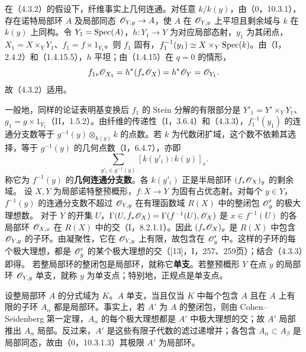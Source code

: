 在（4.3.2）的假设下，纤维事实上几何连通。对任意 $k/k(y)$，由（0，10.3.1），存在诺特局部环 $A$ 及局部同态 $\mathscr O_{Y,y}\to A$，使 $A$ 在 $\mathscr O_{Y,y}$ 上平坦且剩余域与 $k$ 在 $k(y)$ 上同构。令 $Y_1=\operatorname{Spec}(A)$，$h:Y_1\to Y$ 为对应局部态射，$y_1$ 为其闭点，$X_1=X\times_YY_1$、$f_1=f\times1_{Y_1}$。则 $f_1$ 固有，$f_1^{-1}(y_1)\simeq X\times_Y\operatorname{Spec}(k)$。由（I，2.4.2）和（1.4.15.5），$h$ 平坦；由（1.4.15）在 $q=0$ 的情形，
\[
f_{1*}\mathscr O_{X_1}=h^*(f_*\mathscr O_X)=h^*\mathscr O_Y=\mathscr O_{Y_1}.
\]
故（4.3.2）适用。

一般地，同样的论证表明基变换后 $f_1$ 的 Stein 分解的有限部分是 $Y'_1=Y'\times_YY_1$、$g_1=g\times1_{Y_1}$（II，1.5.2）。由纤维的传递性（I，3.6.4）和（4.3.3），$f_1^{-1}(y_1)$ 的连通分支数等于 $g^{-1}(y)\otimes_{k(y)}k$ 的点数。若 $k$ 为代数闭扩域，这个数不依赖其选择，等于 $g^{-1}(y)$ 的几何点数（I，6.4.7），亦即
\[
\sum_{y'_i\in g^{-1}(y)}[k(y'_i):k(y)]_s.
\]
称它为 $f^{-1}(y)$ 的\textbf{几何连通分支数}。各 $k(y'_i)$ 正是半局部环 $(f_*\mathscr O_X)_y$ 的剩余域。
设 $X,Y$ 为局部诺特整预概形，$f:X\to Y$ 为固有占优态射。对每个 $y\in Y$，$f^{-1}(y)$ 的连通分支数不超过 $\mathscr O_{Y,y}$ 在有理函数域 $R(X)$ 中的整闭包 $\mathscr O'_y$ 的极大理想数。
\eproof
对于 $Y$ 的开集 $U$，$\Gamma(U,f_*\mathscr O_X)=\Gamma(f^{-1}(U),\mathscr O_X)$ 是 $x\in f^{-1}(U)$ 的各局部环 $\mathscr O_{X,x}$ 在 $R(X)$ 中的交（I，8.2.1.1）。因此 $(f_*\mathscr O_X)_y$ 是 $R(X)$ 中包含 $\mathscr O_{Y,y}$ 的子环。由凝聚性，它在 $\mathscr O_{Y,y}$ 上有限，故包含在 $\mathscr O'_y$ 中。这样的子环的每个极大理想，都是 $\mathscr O'_y$ 的某个极大理想的交（[13]，I，257、259页）；结合（4.3.3）即得。\finishproof
{}
若整局部环的整闭包是局部环，就称它\textbf{单支}。若整预概形 $Y$ 在点 $y$ 的局部环 $\mathscr O_{Y,y}$ 单支，就称 $y$ 为单支点；特别地，正规点是单支点。

设整局部环 $A$ 的分式域为 $K$。$A$ 单支，当且仅当 $K$ 中每个包含 $A$ 且在 $A$ 上有限的子环 $A_\alpha$ 都是局部环。事实上，若 $A'$ 为 $A$ 的整闭包，则由 Cohen--Seidenberg 第一定理，$A_\alpha$ 的每个极大理想都是 $A'$ 中极大理想的交；故 $A'$ 局部推出 $A_\alpha$ 局部。反过来，$A'$ 是这些有限子代数的滤过递增并；各包含 $A_\alpha\subset A_\beta$ 是局部同态，故由（0，10.3.1.3）其极限 $A'$ 为局部环。

